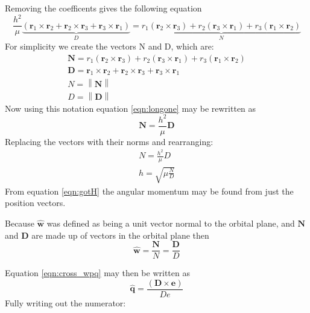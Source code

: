 \documentclass[12pt]{article}
\newcommand{\norm}[1]{\left\lVert#1\right\rVert}
\begin{document}
	 Removing the coefficents gives the following equation
	 \begin{equation}
	 \frac { h ^ { 2 } } { \mu } \underbrace{\left( \mathbf { r } _ { 1 } \times \mathbf { r } _ { 2 } + \mathbf { r } _ { 2 } \times \mathbf { r } _ { 3 } + \mathbf { r } _ { 3 } \times \mathbf { r } _ { 1 } \right)}_{D} = \underbrace{r _ { 1 } \left( \mathbf { r } _ { 2 } \times \mathbf { r } _ { 3 } \right) + r _ { 2 } \left( \mathbf { r } _ { 3 } \times \mathbf { r } _ { 1 } \right) + r _ { 3 } \left( \mathbf { r } _ { 1 } \times \mathbf { r } _ { 2 } \right)}_{N}
	 \label{eqn:longone}
	 \end{equation}
	 For simplicity we create the vectors N and D, which are: 
	 \begin{eqnarray}
	 	 \mathbf { N } = r _ { 1 } \left( \mathbf { r } _ { 2 } \times \mathbf { r } _ { 3 } \right) + r _ { 2 } \left( \mathbf { r } _ { 3 } \times \mathbf { r } _ { 1 } \right) + r _ { 3 } \left( \mathbf { r } _ { 1 } \times \mathbf { r } _ { 2 } \right)\\
	 	 \mathbf { D } = \mathbf { r } _ { 1 } \times \mathbf { r } _ { 2 } + \mathbf { r } _ { 2 } \times \mathbf { r } _ { 3 } + \mathbf { r } _ { 3 } \times \mathbf { r } _ { 1 }\\
	 	 N=\norm{\mathbf{N}}\\
	 	 D=\norm{\mathbf{D}}
	 \end{eqnarray}
 	Now using this notation equation \ref{eqn:longone} may be rewritten as 
	\begin{equation}
	\mathbf { N } = \frac { h ^ { 2 } } { \mu } \mathbf { D }
	\end{equation}
	Replacing the vectors with their norms and rearranging:
	\begin{eqnarray}
	N = \frac { h ^ { 2 } } { \mu } D\\
	h = \sqrt { \mu \frac { N } { D } }
	\label{eqn:gotH}
	\end{eqnarray}
	From equation \ref{eqn:gotH} the angular momentum may be found from just the position vectors.
	
	Because $\hat{ \mathbf { w } }$ was defined as being a unit vector normal to the orbital plane, and $\mathbf{ N }$ and $\mathbf{ D }$ are made up of vectors in the orbital plane then
	\begin{equation}
	\hat{ \mathbf { w } }=\frac{\mathbf{ N }}{N}=\frac{\mathbf{ D }}{D}
	\end{equation}
	
	Equation \ref{eqn:cross_wpq} may then be written as
	\begin{equation}
	\hat { \mathbf { q } } = \frac { ( \mathbf { D } \times \mathbf { e } ) } { D e }
	\label{eqn:p1}
	\end{equation}
	Fully writing out the numerator:
	
\end{document}
